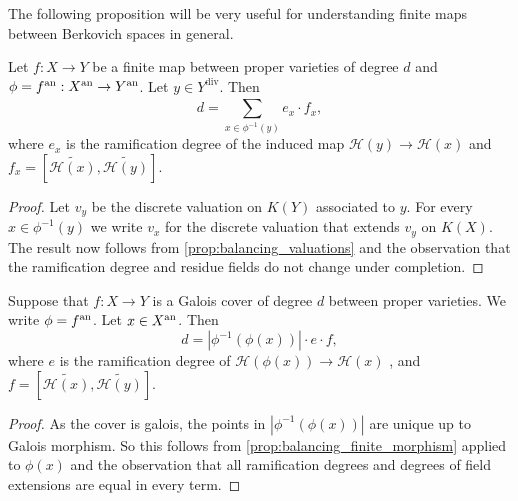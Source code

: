 The following proposition will be very useful for understanding finite maps between Berkovich spaces in general. 
\begin{proposition}\label{prop:balancing_finite_morphism}
	Let $f: X \to Y$ be a finite map between proper varieties of degree $d$ and $\phi = f{}^{\text{an}}: X{}^{\text{an}} \to Y{}^{\text{an}}$. 
	Let $y \in Y^{\text{div}}$. 
	Then 
	\[
		d = \sum_{x \in \phi^{-1}(y)}^{} e_{x} \cdot  f_{x} 
	,\] 
	where $e_x$ is the ramification degree of the induced map  $\mathcal{H} (y) \to \mathcal{H} (x)$ and $f_x = \left[\widetilde{\mathcal{H} (x)}, \widetilde {\mathcal{H} (y)}\right]$.
\end{proposition}
\begin{proof}
	Let $v_y$ be the discrete valuation on $K(Y)$ associated to $y$. 
	For every $x \in \phi^{-1}(y)$ we write $v_x$ for the discrete valuation that extends $v_y$ on $K(X)$. 
	The result now follows from \cref{prop:balancing_valuations} and the observation that the ramification degree and residue fields do not change under completion. 
\end{proof}

\begin{corollary}\label{cor:balancing_galois_cover}
	Suppose that $f: X \to Y$ is a Galois cover of degree $d$ between proper varieties. 
	We write $\phi = f{}^{\text{an}}$. 
	Let $x \in X{}^{\text{an}}$. 
	Then \[
		d = |\phi^{-1}(\phi(x))| \cdot e\cdot f
	,\] 
	where $e$ is the ramification degree of $\mathcal{H} (\phi(x)) \to \mathcal{H} (x)$ , and  $f = \left[\widetilde{\mathcal{H} (x)}, \widetilde {\mathcal{H} (y)}\right]$.
\end{corollary}
\begin{proof}
	As the cover is galois, the points in $|\phi^{-1}(\phi(x))|$ are unique up to Galois morphism.
	So this follows from \cref{prop:balancing_finite_morphism} applied to $\phi(x)$ and the observation that all ramification degrees and degrees of field extensions are equal in every term. 
\end{proof}

